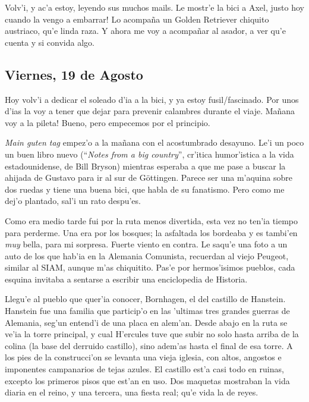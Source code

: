 Volv'i, y ac'a estoy, leyendo sus muchos mails. Le mostr'e la bici a Axel,
\textexclamdown justo hoy cuando la vengo a embarrar! Lo acompa\~na un Golden
Retriever chiquito austriaco, qu'e linda raza. Y ahora me voy a acompa\~nar al
asador, a ver qu'e cuenta y si convida algo.

\subsection*{Viernes, 19 de Agosto}

Hoy volv'i a dedicar el soleado d'ia a la bici, y ya estoy fusil/fascinado. Por
unos d'ias la voy a tener que dejar para prevenir calambres durante el viaje.
\textexclamdown Ma\~nana voy a la pileta! Bueno, pero empecemos por el
principio.

\emph{Main guten tag} empez'o a la ma\~nana con el acostumbrado desayuno. Le'i
un poco un buen libro nuevo (``\emph{Notes from a big country}'', cr'itica
humor'istica a la vida estadounidense, de Bill Bryson) mientras esperaba a que
me pase a buscar la ahijada de Gustavo para ir al sur de G\"ottingen. Parece ser
una m'aquina sobre dos ruedas y tiene una buena bici, que habla de su fanatismo.
Pero como me dej'o plantado, sal'i un rato despu'es.

Como era medio tarde fui por la ruta menos divertida, esta vez
no ten'ia tiempo para perderme. Una era por los bosques; la asfaltada los
bordeaba y es tambi'en \emph{muy} bella, para mi sorpresa. Fuerte viento en
contra. Le saqu'e una foto a un auto de los que hab'ia en la Alemania Comunista,
recuerdan al viejo Peugeot, similar al {\small SIAM}, aunque m'as chiquitito.
Pas'e por hermos'isimos pueblos, cada esquina invitaba a sentarse a escribir una
enciclopedia de Historia.

Llegu'e al pueblo que quer'ia conocer, Bornhagen, el del castillo de
Hanstein. Hanstein fue una familia que particip'o en las 'ultimas tres grandes
guerras de Alemania, seg'un entend'i de una placa en alem'an. Desde abajo en la
ruta se ve'ia la torre principal, y cual H'ercules tuve que subir no solo hasta
arriba de la colina (la base del derruido castillo), sino adem'as hasta el final
de esa torre. A los pies de la construcci'on se levanta una vieja iglesia,
con altos, angostos e imponentes campanarios de tejas azules. El castillo est'a
casi todo en ruinas, excepto los primeros pisos que est'an en uso. Dos
maquetas mostraban la vida diaria en el reino, y una tercera, una fiesta real;
qu'e vida la de reyes.

